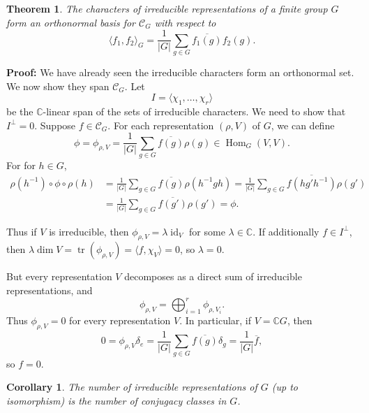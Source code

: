 \documentclass[12pt]{article}
\DeclareMathOperator{\tr}{tr}
\DeclareMathOperator{\id}{id}
\DeclareMathOperator{\Hom}{Hom}
\newtheorem{theorem}{Theorem}[section]
\newtheorem{corollary}{Corollary}[section]
\theoremstyle{definition}
\theoremstyle{remark}
\begin{document}
\begin{theorem}
	The characters of irreducible representations of a finite group $G$ form an orthonormal basis for $\mathcal{C}_G$ with respect to
	\[
		\langle f_1, f_2 \rangle_G = \frac{1}{|G|} \sum_{g \in G}\overline{f_1(g)}f_2(g)
	.\]
\end{theorem}

\begin{adjustbox}{minipage = \columnwidth - 25.5pt, margin=1em, frame=1pt, margin=0em}
\textbf{Proof:} We have already seen the irreducible characters form an orthonormal set. We now show they span $\mathcal{C}_G$. Let
\[
	I = \langle \chi_1, \ldots, \chi_r \rangle
\]
be the $\mathbb{C}$-linear span of the sets of irreducible characters. We need to show that $I^{\perp} = 0$. Suppose $f \in \mathcal{C}_G$. For each representation $(\rho, V)$ of $G$, we can define
\[
	\phi = \phi_{\rho, V} = \frac{1}{|G|} \sum_{g \in G} \overline{f(g)}\rho(g) \in \Hom_G(V, V)
.\]
For for $h \in G$,
\begin{align*}
	\rho(h^{-1}) \circ \phi \circ \rho(h) &= \frac{1}{|G|} \sum_{g \in G} \overline{f(g)}\rho(h^{-1}gh) = \frac{1}{|G|} \sum_{g \in G} \overline{f(hg'h^{-1})}\rho(g') \\
					      &= \frac{1}{|G|} \sum_{g \in G} \overline{f(g')} \rho(g') = \phi.
\end{align*}
\end{adjustbox}

\begin{adjustbox}{minipage = \columnwidth - 25.5pt, margin=1em, frame=1pt, margin=0em}
Thus if $V$ is irreducible, then $\phi_{\rho, V} = \lambda \id_V$ for some $\lambda \in \mathbb{C}$. If additionally $f \in I^{\perp}$, then $\lambda \dim V = \tr(\phi_{\rho, V}) = \langle f, \chi_V \rangle = 0$, so $\lambda = 0$.

But every representation $V$ decomposes as a direct sum of irreducible representations, and
\[
\phi_{\rho, V} = \bigoplus_{i = 1}^{r} \phi_{\rho, V_i}
.\]
Thus $\phi_{\rho, V} = 0$ for every representation $V$. In particular, if $V = \mathbb{C} G$, then
\[
	0 = \phi_{\rho, V} \delta_e = \frac{1}{|G|} \sum_{g \in G} \overline{f(g)} \delta_{g} = \frac{1}{|G|} \overline{f}
,\]
so $f = 0$.

\end{adjustbox}


\begin{corollary}
	The number of irreducible representations of $G$ (up to isomorphism) is the number of conjugacy classes in $G$.
\end{corollary}
\end{document}
